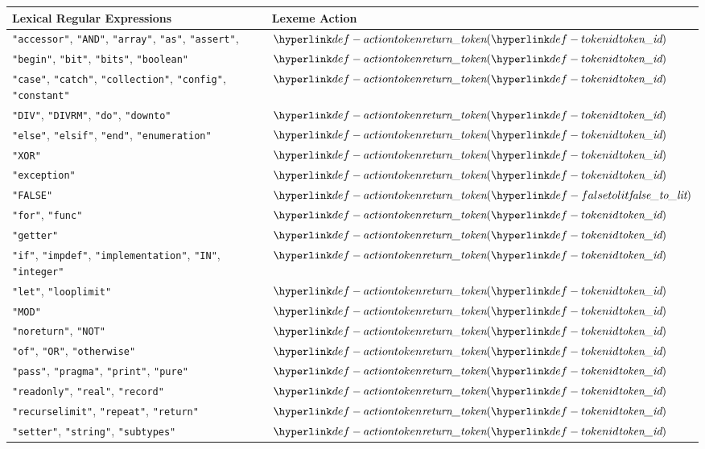 \begin{center}
\begin{tabular}{ll}
\textbf{Lexical Regular Expressions} & \textbf{Lexeme Action}\\
\hline
\texttt{"accessor"}, \texttt{"AND"}, \texttt{"array"}, \texttt{"as"}, \texttt{"assert"},      & $\actiontoken(\tokenid)$ \\
\texttt{"begin"}, \texttt{"bit"}, \texttt{"bits"}, \texttt{"boolean"}       & $\actiontoken(\tokenid)$ \\
\texttt{"case"}, \texttt{"catch"}, \texttt{"collection"}, \texttt{"config"}, \texttt{"constant"}      & $\actiontoken(\tokenid)$ \\
\texttt{"DIV"}, \texttt{"DIVRM"}, \texttt{"do"}, \texttt{"downto"}        & $\actiontoken(\tokenid)$ \\
\texttt{"else"}, \texttt{"elsif"}, \texttt{"end"}, \texttt{"enumeration"}   & $\actiontoken(\tokenid)$ \\
\texttt{"XOR"}           & $\actiontoken(\tokenid)$ \\
\texttt{"exception"}     & $\actiontoken(\tokenid)$ \\
\texttt{"FALSE"} & $\actiontoken(\falsetolit)$  \\
\texttt{"for"}, \texttt{"func"}          & $\actiontoken(\tokenid)$ \\
\texttt{"getter"}        & $\actiontoken(\tokenid)$ \\
\texttt{"if"}, \texttt{"impdef"}, \texttt{"implementation"}, \texttt{"IN"}, \texttt{"integer"}       & $\actiontoken(\tokenid)$ \\
\texttt{"let"}, \texttt{"looplimit"}           & $\actiontoken(\tokenid)$ \\
\texttt{"MOD"}           & $\actiontoken(\tokenid)$ \\
\texttt{"noreturn"}, \texttt{"NOT"}           & $\actiontoken(\tokenid)$ \\
\texttt{"of"},      \texttt{"OR"},      \texttt{"otherwise"}                  & $\actiontoken(\tokenid)$ \\
\texttt{"pass"},    \texttt{"pragma"},  \texttt{"print"}, \texttt{"pure"}                      & $\actiontoken(\tokenid)$ \\
\texttt{"readonly"}, \texttt{"real"},    \texttt{"record"}  & $\actiontoken(\tokenid)$ \\
\texttt{"recurselimit"}, \texttt{"repeat"}, \texttt{"return"}  & $\actiontoken(\tokenid)$ \\
\texttt{"setter"},  \texttt{"string"},  \texttt{"subtypes"}                   & $\actiontoken(\tokenid)$ \\

\end{tabular}
\end{center}
